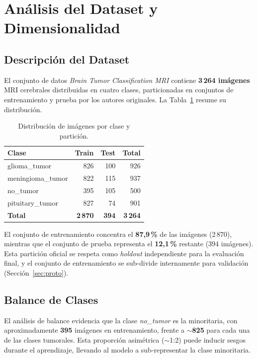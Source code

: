 \section{Análisis del Dataset y Dimensionalidad}
\label{sec:eda}

\subsection{Descripción del Dataset}
El conjunto de datos \textit{Brain Tumor Classification MRI}
contiene \textbf{3\,264 imágenes} MRI cerebrales distribuidas en
cuatro clases, particionadas en conjuntos de entrenamiento y
prueba por los autores originales. La Tabla~\ref{tab:dist}
resume su distribución.

\begin{table}[H]
\centering
\caption{Distribución de imágenes por clase y partición.}
\label{tab:dist}
\begin{tabular}{lrrr}
\toprule
\textbf{Clase} & \textbf{Train} & \textbf{Test} & \textbf{Total} \\
\midrule
glioma\_tumor      & 826 & 100 & 926 \\
meningioma\_tumor  & 822 & 115 & 937 \\
no\_tumor          & 395 & 105 & 500 \\
pituitary\_tumor   & 827 &  74 & 901 \\
\midrule
\textbf{Total}     & \textbf{2\,870} & \textbf{394} & \textbf{3\,264} \\
\bottomrule
\end{tabular}
\end{table}

El conjunto de entrenamiento concentra el \textbf{87{,}9\,\%} de las
imágenes (2\,870), mientras que el conjunto de prueba representa
el \textbf{12{,}1\,\%} restante (394 imágenes). Esta partición
oficial se respeta como \textit{holdout} independiente para la
evaluación final, y el conjunto de entrenamiento se sub-divide
internamente para validación (Sección~\ref{sec:proto}).

\subsection{Balance de Clases}
El análisis de balance evidencia que la clase \textit{no\_tumor}
es la minoritaria, con aproximadamente \textbf{395} imágenes en
entrenamiento, frente a $\sim$\textbf{825} para cada una de las
clases tumorales. Esta proporción asimétrica ($\sim$1:2) puede
inducir sesgos durante el aprendizaje, llevando al modelo a
sub-representar la clase minoritaria.

